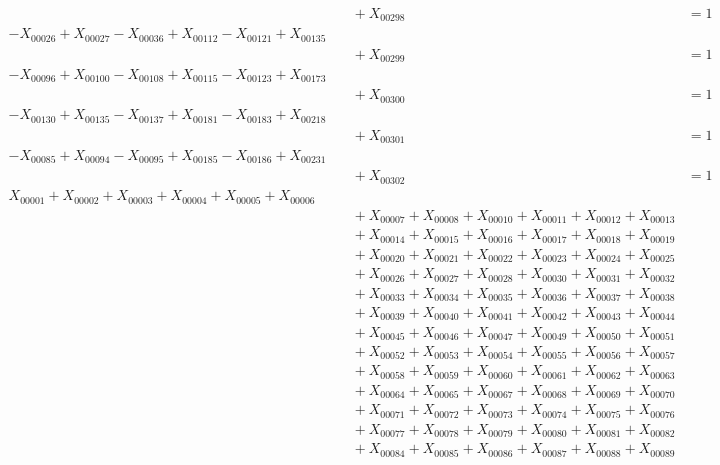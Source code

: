 \documentclass[a4paper,10pt]{article}
\begin{document}
{\begin{align}
&\quad  + X_{00298} &= 1 && \text{(R00067)} \\
-X_{00026} + X_{00027} - X_{00036} + X_{00112} - X_{00121} + X_{00135} \\[0.5ex]
&\quad  + X_{00299} &= 1 && \text{(R00068)} \\
-X_{00096} + X_{00100} - X_{00108} + X_{00115} - X_{00123} + X_{00173} \\[0.5ex]
&\quad  + X_{00300} &= 1 && \text{(R00069)} \\
-X_{00130} + X_{00135} - X_{00137} + X_{00181} - X_{00183} + X_{00218} \\[0.5ex]
&\quad  + X_{00301} &= 1 && \text{(R00070)} \\
-X_{00085} + X_{00094} - X_{00095} + X_{00185} - X_{00186} + X_{00231} \\[0.5ex]
&\quad  + X_{00302} &= 1 && \text{(R00071)} \\
X_{00001} + X_{00002} + X_{00003} + X_{00004} + X_{00005} + X_{00006} \\[0.5ex]
&\quad  + X_{00007} + X_{00008} + X_{00010} + X_{00011} + X_{00012} + X_{00013} \\[0.5ex]
&\quad  + X_{00014} + X_{00015} + X_{00016} + X_{00017} + X_{00018} + X_{00019} \\[0.5ex]
&\quad  + X_{00020} + X_{00021} + X_{00022} + X_{00023} + X_{00024} + X_{00025} \\[0.5ex]
&\quad  + X_{00026} + X_{00027} + X_{00028} + X_{00030} + X_{00031} + X_{00032} \\[0.5ex]
&\quad  + X_{00033} + X_{00034} + X_{00035} + X_{00036} + X_{00037} + X_{00038} \\[0.5ex]
&\quad  + X_{00039} + X_{00040} + X_{00041} + X_{00042} + X_{00043} + X_{00044} \\[0.5ex]
&\quad  + X_{00045} + X_{00046} + X_{00047} + X_{00049} + X_{00050} + X_{00051} \\[0.5ex]
&\quad  + X_{00052} + X_{00053} + X_{00054} + X_{00055} + X_{00056} + X_{00057} \\[0.5ex]
&\quad  + X_{00058} + X_{00059} + X_{00060} + X_{00061} + X_{00062} + X_{00063} \\[0.5ex]
&\quad  + X_{00064} + X_{00065} + X_{00067} + X_{00068} + X_{00069} + X_{00070} \\[0.5ex]
&\quad  + X_{00071} + X_{00072} + X_{00073} + X_{00074} + X_{00075} + X_{00076} \\[0.5ex]
&\quad  + X_{00077} + X_{00078} + X_{00079} + X_{00080} + X_{00081} + X_{00082} \\[0.5ex]
&\quad  + X_{00084} + X_{00085} + X_{00086} + X_{00087} + X_{00088} + X_{00089} \\[0.5ex]

\end{align}}
\end{document}

